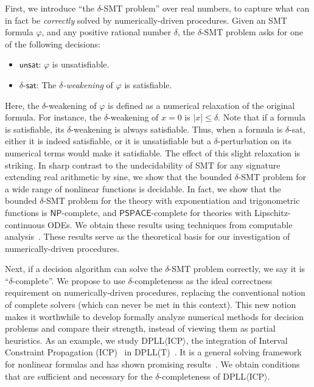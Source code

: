 \documentclass[prodmode]{acmsmall} %
\begin{document}
First, we introduce ``the $\delta$-SMT problem'' over real numbers, to capture what can in fact be {\em correctly} solved by numerically-driven procedures. Given an SMT formula $\varphi$, and any positive rational number $\delta$, the $\delta$-SMT problem asks for one of the following decisions:
\begin{itemize}
\item $\mathsf{unsat}$: $\varphi$ is unsatisfiable.
\item $\delta$-$\mathsf{sat}$: The {\em $\delta$-weakening} of $\varphi$ is satisfiable. 
\end{itemize}
Here, the $\delta$-weakening of $\varphi$ is defined as a numerical relaxation of the original formula. For instance, the $\delta$-weakening of $x=0$ is $|x|\leq\delta$. Note that if a formula is satisfiable, its $\delta$-weakening is always satisfiable. Thus, when a formula is $\delta$-{\sf sat}, either it is indeed satisfiable, or it is unsatisfiable but a $\delta$-perturbation on its numerical terms would make it satisfiable. The effect of this slight relaxation is striking. In sharp contrast to the undecidability of SMT for any signature extending real arithmetic by sine, we show that the bounded $\delta$-SMT problem for a wide range of nonlinear functions is decidable. 
In fact, we show that the bounded $\delta$-SMT problem for the theory with exponentiation and trigonometric functions is $\mathsf{NP}$-complete, and $\mathsf{PSPACE}$-complete for theories with Lipschitz-continuous ODEs. We obtain these results using techniques from computable analysis~\cite{CAbook,vasco}. These results serve as the theoretical basis for our investigation of numerically-driven procedures. 

Next, if a decision algorithm can solve the $\delta$-SMT problem correctly, we say it is ``$\delta$-complete''. We propose to use $\delta$-completeness as the ideal correctness requirement on numerically-driven procedures, replacing the conventional notion of complete solvers (which can never be met in this context). This new notion makes it worthwhile to develop formally analyze numerical methods for decision problems and compare their strength, instead of viewing them as partial heuristics. As an example, we study DPLL$\langle$ICP$\rangle$, the integration of Interval Constraint Propagation (ICP)~\cite{newton} in DPLL(T)~\cite{DPbook}. It is a general solving framework for nonlinear formulas and has shown promising results~\cite{HySAT,DBLP:conf/fmcad/Gao10,DBLP:conf/sefm/EggersRNF11}. We obtain conditions that are sufficient and necessary for the $\delta$-completeness of DPLL$\langle$ICP$\rangle$. 
\end{document}
